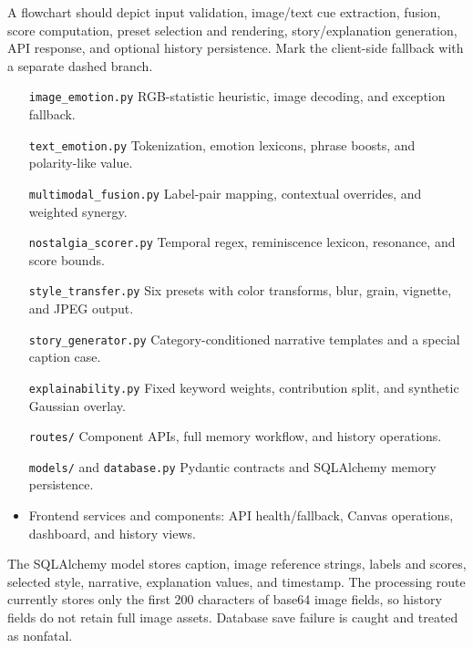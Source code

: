 \documentclass[conference]{IEEEtran}
\begin{document}
{} A flowchart should depict input validation, image/text cue extraction, fusion, score computation, preset selection and rendering, story/explanation generation, API response, and optional history persistence. Mark the client-side fallback with a separate dashed branch.\markdownRendererInterblockSeparator
{}
\markdownRendererSectionEnd \markdownRendererSectionBegin
{}\markdownRendererInterblockSeparator
{}\begin{itemize}
\item[\texttt{image\_emotion.py}] RGB-statistic heuristic, image decoding, and exception fallback.
\item[\texttt{text\_emotion.py}] Tokenization, emotion lexicons, phrase boosts, and polarity-like value.
\item[\texttt{multimodal\_fusion.py}] Label-pair mapping, contextual overrides, and weighted synergy.
\item[\texttt{nostalgia\_scorer.py}] Temporal regex, reminiscence lexicon, resonance, and score bounds.
\item[\texttt{style\_transfer.py}] Six presets with color transforms, blur, grain, vignette, and JPEG output.
\item[\texttt{story\_generator.py}] Category-conditioned narrative templates and a special caption case.
\item[\texttt{explainability.py}] Fixed keyword weights, contribution split, and synthetic Gaussian overlay.
\item[\texttt{routes/}] Component APIs, full memory workflow, and history operations.
\item[\texttt{models/} and \texttt{database.py}] Pydantic contracts and SQLAlchemy memory persistence.
\item Frontend services and components: API health/fallback, Canvas operations, dashboard, and history views.
\end{itemize}\markdownRendererInterblockSeparator
{}The SQLAlchemy model stores caption, image reference strings, labels and scores, selected style, narrative, explanation values, and timestamp. The processing route currently stores only the first 200 characters of base64 image fields, so history fields do not retain full image assets. Database save failure is caught and treated as nonfatal.\markdownRendererInterblockSeparator
{}
\markdownRendererSectionEnd \markdownRendererSectionBegin
{}\markdownRendererInterblockSeparator
\end{document}

